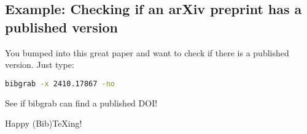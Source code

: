 \documentclass[11pt]{article}
\begin{document}
\subsection*{Example: Checking if an arXiv preprint has a published version}
You bumped into this great paper and want to check if there is a published version. Just type:
\begin{lstlisting}[language=bash]
bibgrab -x 2410.17867 -no
\end{lstlisting}
See if bibgrab can find a published DOI!

Happy (Bib)TeXing!
\end{document}
